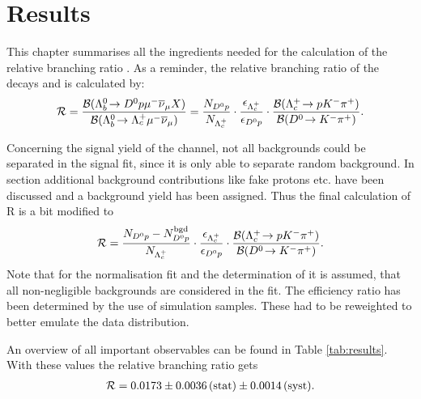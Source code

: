 \chapter{Results}
\label{sec:Results}
This chapter summarises all the ingredients needed for the calculation of the relative branching ratio \R.
As a reminder, the relative branching ratio of the decays \LbToDpmunuX and \LbToLcmunu is calculated by:
\begin{align}
	\mathcal{R} =
	\frac{{\cal B}({{\Lambda}^0_{b}}\!\rightarrow {\ensuremath{{D}^0}}{\ensuremath{p}} {\ensuremath{\mu^-}} {\ensuremath{{\overline{\nu}}_\mu}} X)}{{\cal B}({{\Lambda}^0_{b}}\!\rightarrow {\ensuremath{{\Lambda}^+_{c}}} {\ensuremath{\mu^-}}{\ensuremath{{\overline{\nu}}_\mu}})}
	 = 
	 \frac{N_{{{D}^0}{p}}}{N_{{{\Lambda}^+_{c}}}}  
	 \cdot \frac{\epsilon_{{{\Lambda}^+_{c}}}}{\epsilon_{{{D}^0}{p}}}
	 \cdot \frac{{\cal B}({{\Lambda}^+_{c}}\!\rightarrow p {{K}^-} {{\pi}^+})}{{\cal B}({{D}^0}\!\rightarrow {\ensuremath{{K}^-}}{\ensuremath{{\pi}^+}})}.
\end{align}

Concerning the signal yield \NDp of the \LbToDpmunuX channel, not all backgrounds could be separated in the signal fit, since it is only able to separate random background.
In section  additional background contributions like fake protons etc. have been discussed and a background yield \NBgdDp has been assigned.
Thus the final calculation of R is a bit modified to
\begin{align}
	\mathcal{R} =
	 \frac{N_{{{D}^0}{p}}-N^{\rm bgd}_{{{D}^0}{p}}}{N_{{{\Lambda}^+_{c}}}}  
	 \cdot \frac{\epsilon_{{{\Lambda}^+_{c}}}}{\epsilon_{{{D}^0}{p}}}
	 \cdot \frac{{\cal B}({{\Lambda}^+_{c}}\!\rightarrow p {{K}^-} {{\pi}^+})}{{\cal B}({{D}^0}\!\rightarrow {\ensuremath{{K}^-}}{\ensuremath{{\pi}^+}})}. \label{eq:R_mod}
\end{align}
Note that for the normalisation fit and the determination of \NLc it is assumed, that all non-negligible backgrounds are considered in the fit.
The efficiency ratio \effRatio has been determined by the use of simulation samples.
These had to be reweighted to better emulate the data distribution.


An overview of all important observables can be found in Table \ref{tab:results}.
With these values the relative branching ratio \R gets
\begin{align*}
    \mathcal{R} = 0.0173 \pm 0.0036\mathrm{\,(stat)} \pm 0.0014\mathrm{\,(syst)}.
\end{align*}
